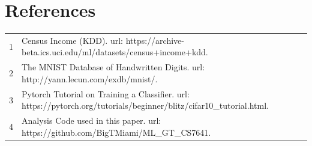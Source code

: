 \documentclass[letterpaper]{article} %
\begin{document}
\section{References}
\begin{tabular}{l p{2.75in}}
\\
1 & Census Income (KDD). url: https://archive-beta.ics.uci.edu/ml/datasets/census+income+kdd.
\\
2 & The MNIST Database of Handwritten Digits. url: http://yann.lecun.com/exdb/mnist/.
\\
3 & Pytorch Tutorial on Training a Classifier. url: https://pytorch.org/tutorials/beginner/blitz/cifar10\_tutorial.html.
\\
4 & Analysis Code used in this paper. url: https://github.com/BigTMiami/ML\_GT\_CS7641.

\end{tabular}
\end{document}
